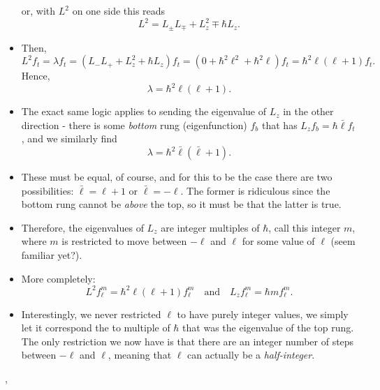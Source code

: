 \begin{itemize}
        or, with $L^2$ on one side this reads   
        \begin{equation}
            L^2 = L_{\pm}L_{\mp} + L_z^2 \mp \hbar L_z.
        \end{equation}
    \item Then,
        \begin{equation}
            L^2 f_t = \lambda f_t = (L_-L_+ + L_z^2 + \hbar L_z)f_t = (0+\hbar^2\ell^2 + \hbar^2\ell)f_t = \hbar^2\ell(\ell+1)f_t.
        \end{equation}
        Hence,
        \begin{equation}
            \lambda = \hbar^2 \ell(\ell+1).
        \end{equation}
    \item The exact same logic applies to sending the eigenvalue of $L_z$ in the other direction - there is some \textit{bottom} rung (eigenfunction) $f_b$ that has $L_z f_b = \hbar \bar{\ell}f_t$, and we similarly find
        \begin{equation}
            \lambda = \hbar^2 \bar{\ell}(\bar{\ell}+1).
        \end{equation}
    \item These must be equal, of course, and for this to be the case there are two possibilities: $\bar{\ell} = \ell+1$ or $\bar{\ell} = -\ell$. The former is ridiculous since the bottom rung cannot be \textit{above} the top, so it must be that the latter is true.
    \item Therefore, the eigenvalues of $L_z$ are integer multiples of $\hbar$, call this integer $m$, where $m$ is restricted to move between $-\ell$ and $\ell$ for some value of $\ell$ (seem familiar yet?).
    \item More completely:
        \begin{equation}
            L^2f_{\ell}^m = \hbar^2 \ell(\ell+1)f_{\ell}^m \quad\mathrm{and}\quad L_zf_{\ell}^m = \hbar m f_{\ell}^m.
        \end{equation}
    \item Interestingly, we never restricted $\ell$ to have purely integer values, we simply let it correspond the to multiple of $\hbar$ that was the eigenvalue of the top rung. The only restriction we now have is that there are an integer number of steps between $-\ell$ and $\ell$, meaning that $\ell$ can actually be a \textit{half-integer}.
\end{itemize}

\sep

